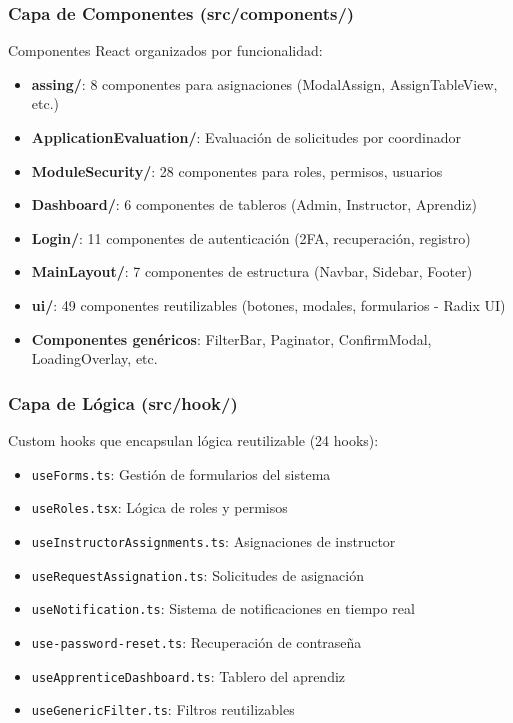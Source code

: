 \subsubsection{Capa de Componentes (src/components/)}

Componentes React organizados por funcionalidad:

\begin{itemize}
    \item \textbf{assing/}: 8 componentes para asignaciones (ModalAssign, AssignTableView, etc.)
    \item \textbf{ApplicationEvaluation/}: Evaluación de solicitudes por coordinador
    \item \textbf{ModuleSecurity/}: 28 componentes para roles, permisos, usuarios
    \item \textbf{Dashboard/}: 6 componentes de tableros (Admin, Instructor, Aprendiz)
    \item \textbf{Login/}: 11 componentes de autenticación (2FA, recuperación, registro)
    \item \textbf{MainLayout/}: 7 componentes de estructura (Navbar, Sidebar, Footer)
    \item \textbf{ui/}: 49 componentes reutilizables (botones, modales, formularios - Radix UI)
    \item \textbf{Componentes genéricos}: FilterBar, Paginator, ConfirmModal, LoadingOverlay, etc.
\end{itemize}

\subsubsection{Capa de Lógica (src/hook/)}

Custom hooks que encapsulan lógica reutilizable (24 hooks):

\begin{itemize}
    \item \texttt{useForms.ts}: Gestión de formularios del sistema
    \item \texttt{useRoles.tsx}: Lógica de roles y permisos
    \item \texttt{useInstructorAssignments.ts}: Asignaciones de instructor
    \item \texttt{useRequestAssignation.ts}: Solicitudes de asignación
    \item \texttt{useNotification.ts}: Sistema de notificaciones en tiempo real
    \item \texttt{use-password-reset.ts}: Recuperación de contraseña
    \item \texttt{useApprenticeDashboard.ts}: Tablero del aprendiz
    \item \texttt{useGenericFilter.ts}: Filtros reutilizables
\end{itemize}

